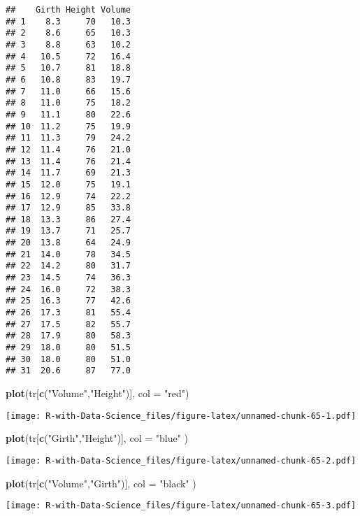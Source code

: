 \documentclass[
]{article}
\newenvironment{Shaded}{\begin{snugshade}}{\end{snugshade}}
\newcommand{\AttributeTok}[1]{\textcolor[rgb]{0.13,0.29,0.53}{#1}}
\newcommand{\FunctionTok}[1]{\textcolor[rgb]{0.13,0.29,0.53}{\textbf{#1}}}
\newcommand{\NormalTok}[1]{#1}
\newcommand{\StringTok}[1]{\textcolor[rgb]{0.31,0.60,0.02}{#1}}
\begin{document}
\begin{verbatim}
##    Girth Height Volume
## 1    8.3     70   10.3
## 2    8.6     65   10.3
## 3    8.8     63   10.2
## 4   10.5     72   16.4
## 5   10.7     81   18.8
## 6   10.8     83   19.7
## 7   11.0     66   15.6
## 8   11.0     75   18.2
## 9   11.1     80   22.6
## 10  11.2     75   19.9
## 11  11.3     79   24.2
## 12  11.4     76   21.0
## 13  11.4     76   21.4
## 14  11.7     69   21.3
## 15  12.0     75   19.1
## 16  12.9     74   22.2
## 17  12.9     85   33.8
## 18  13.3     86   27.4
## 19  13.7     71   25.7
## 20  13.8     64   24.9
## 21  14.0     78   34.5
## 22  14.2     80   31.7
## 23  14.5     74   36.3
## 24  16.0     72   38.3
## 25  16.3     77   42.6
## 26  17.3     81   55.4
## 27  17.5     82   55.7
## 28  17.9     80   58.3
## 29  18.0     80   51.5
## 30  18.0     80   51.0
## 31  20.6     87   77.0
\end{verbatim}

\begin{Shaded}
\begin{Highlighting}[]
\FunctionTok{plot}\NormalTok{(tr[}\FunctionTok{c}\NormalTok{(}\StringTok{"Volume"}\NormalTok{,}\StringTok{"Height"}\NormalTok{)], }\AttributeTok{col =} \StringTok{"red"}\NormalTok{)}
\end{Highlighting}
\end{Shaded}

\texttt{[image: R-with-Data-Science\_files/figure-latex/unnamed-chunk-65-1.pdf]}

\begin{Shaded}
\begin{Highlighting}[]
\FunctionTok{plot}\NormalTok{(tr[}\FunctionTok{c}\NormalTok{(}\StringTok{"Girth"}\NormalTok{,}\StringTok{"Height"}\NormalTok{)], }\AttributeTok{col =} \StringTok{"blue"}\NormalTok{ )}
\end{Highlighting}
\end{Shaded}

\texttt{[image: R-with-Data-Science\_files/figure-latex/unnamed-chunk-65-2.pdf]}

\begin{Shaded}
\begin{Highlighting}[]
\FunctionTok{plot}\NormalTok{(tr[}\FunctionTok{c}\NormalTok{(}\StringTok{"Volume"}\NormalTok{,}\StringTok{"Girth"}\NormalTok{)], }\AttributeTok{col =} \StringTok{"black"}\NormalTok{ )}
\end{Highlighting}
\end{Shaded}

\texttt{[image: R-with-Data-Science\_files/figure-latex/unnamed-chunk-65-3.pdf]}
\end{document}
